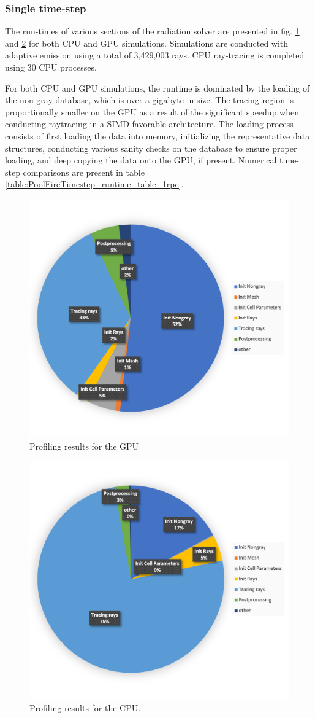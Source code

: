 \subsubsection{Single time-step}
The run-times of various sections of the radiation solver are presented in fig. \ref{fig:PoolFire_profiling} and \ref{fig:PoolFire_profiling_CPU} for both CPU and GPU simulations. Simulations are conducted with adaptive emission using a total of 3,429,003 rays.
CPU ray-tracing is completed using 30 CPU processes. 

For both CPU and GPU simulations, the runtime is dominated by the loading of the non-gray database, which is over a gigabyte in size. 
The tracing region is proportionally smaller on the GPU as a result of the significant speedup when conducting raytracing in a SIMD-favorable architecture.
The loading process consists of first loading the data into memory, initializing the representative data structures, conducting various sanity checks on the database to ensure proper loading, and deep copying the data onto the GPU, if present.
Numerical time-step comparisons are present in table \ref{table:PoolFireTimestep_runtime_table_1rpc}.

\begin{figure}
\centering
\includegraphics[width=0.675\linewidth]{figures/ch4/PoolFire_profiling_OnetimestepGPU.png}
\caption{Profiling results for the GPU}
\label{fig:PoolFire_profiling}
\end{figure}
\begin{figure}
\includegraphics[width=0.675\linewidth]{figures/ch4/PoolFire_profiling_OnetimestepCPU.png}
\caption{Profiling results for the CPU.}
\label{fig:PoolFire_profiling_CPU}
\end{figure}

